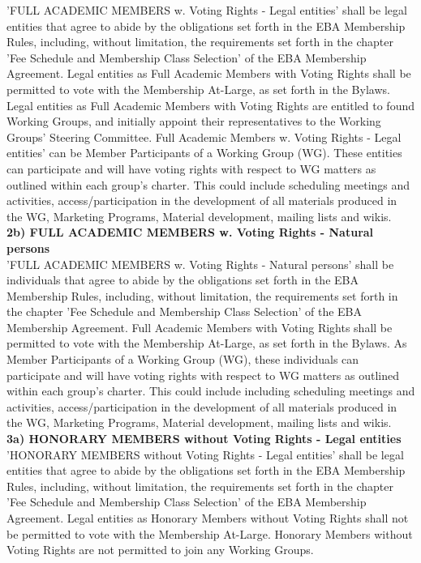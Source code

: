 \documentclass{article}
\begin{document}
'FULL ACADEMIC MEMBERS w. Voting Rights - Legal entities' shall be legal entities that agree to abide by the obligations set forth in the EBA Membership Rules, including, without limitation, the requirements set forth in the chapter 'Fee Schedule and Membership Class Selection' of the EBA Membership Agreement. 
Legal entities as Full Academic Members with Voting Rights shall be permitted to vote with the Membership At-Large, as set forth in the Bylaws. Legal entities as Full Academic Members with Voting Rights are entitled to found Working Groups, and initially appoint their representatives to the Working Groups' Steering Committee. 
Full Academic Members w. Voting Rights - Legal entities' can be Member Participants of a Working Group (WG). These entities can participate and will have voting rights with respect to WG matters as outlined within each group's charter. 
This could include scheduling meetings and activities, access/participation in the development of all materials produced in the WG, Marketing Programs, Material development, mailing lists and wikis. \\

\textbf{2b) FULL ACADEMIC MEMBERS w. Voting Rights - Natural persons} \\

'FULL ACADEMIC MEMBERS w. Voting Rights - Natural persons' shall be individuals that agree to abide by the obligations set forth in the EBA Membership Rules, including, without limitation, the requirements set forth in the chapter 'Fee Schedule and Membership Class Selection' of the EBA Membership Agreement. 
Full Academic Members with Voting Rights shall be permitted to vote with the Membership At-Large, as set forth in the Bylaws. 
As Member Participants of a Working Group (WG), these individuals can participate and will have voting rights with respect to WG matters as outlined within each group's charter. 
This could include including scheduling meetings and activities, access/participation in the development of all materials produced in the WG, Marketing Programs, Material development, mailing lists and wikis. \\

\textbf{3a) HONORARY MEMBERS without Voting Rights - Legal entities} \\

'HONORARY MEMBERS without Voting Rights - Legal entities' shall be legal entities that agree to abide by the obligations set forth in the EBA Membership Rules, including, without limitation, the requirements set forth in the chapter 'Fee Schedule and Membership Class Selection' of the EBA Membership Agreement. 
Legal entities as Honorary Members without Voting Rights shall not be permitted to vote with the Membership At-Large. 
Honorary Members without Voting Rights are not permitted to join any Working Groups. \\
\end{document}
